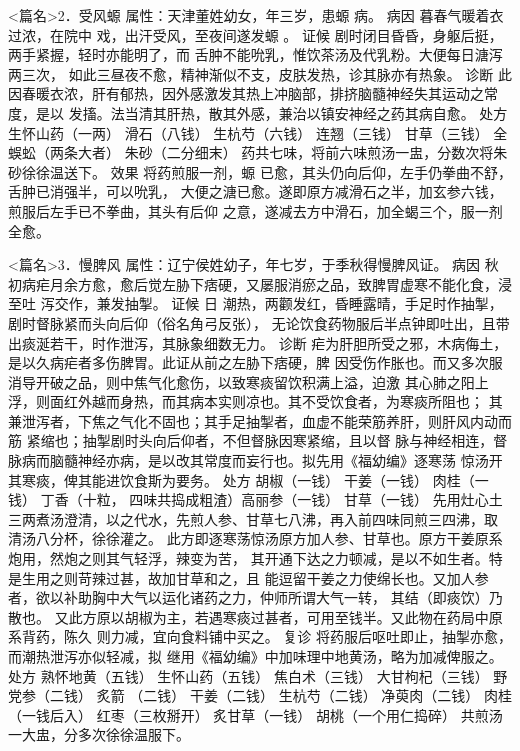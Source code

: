 \documentclass[a4paper,12pt,UTF8,twoside]{ctexbook}
\begin{document}
<篇名>2．受风螈
属性：天津董姓幼女，年三岁，患螈 病。 
病因 暮春气暖着衣过浓，在院中 戏，出汗受风，至夜间遂发螈 。 
证候 剧时闭目昏昏，身躯后挺，两手紧握，轻时亦能明了，而 
舌肿不能吮乳，惟饮茶汤及代乳粉。大便每日溏泻两三次， 
如此三昼夜不愈，精神渐似不支，皮肤发热，诊其脉亦有热象。 
诊断 此因春暖衣浓，肝有郁热，因外感激发其热上冲脑部，排挤脑髓神经失其运动之常度，是以 
发搐。法当清其肝热，散其外感，兼治以镇安神经之药其病自愈。 
处方 生怀山药（一两） 滑石（八钱） 生杭芍（六钱） 连翘（三钱） 
甘草（三钱） 全蜈蚣（两条大者） 朱砂（二分细末） 
药共七味，将前六味煎汤一盅，分数次将朱砂徐徐温送下。 
效果 将药煎服一剂，螈 已愈，其头仍向后仰，左手仍拳曲不舒，舌肿已消强半，可以吮乳， 
大便之溏已愈。遂即原方减滑石之半，加玄参六钱，煎服后左手已不拳曲，其头有后仰 
之意，遂减去方中滑石，加全蝎三个，服一剂全愈。 

<篇名>3．慢脾风
属性：辽宁侯姓幼子，年七岁，于季秋得慢脾风证。 
病因 秋初病疟月余方愈，愈后觉左胁下痞硬，又屡服消瘀之品，致脾胃虚寒不能化食，浸至吐 
泻交作，兼发抽掣。 
证候 日 潮热，两颧发红，昏睡露晴，手足时作抽掣，剧时督脉紧而头向后仰（俗名角弓反张）， 
无论饮食药物服后半点钟即吐出，且带出痰涎若干，时作泄泻，其脉象细数无力。 
诊断 疟为肝胆所受之邪，木病侮土，是以久病疟者多伤脾胃。此证从前之左胁下痞硬，脾 
因受伤作胀也。而又多次服消导开破之品，则中焦气化愈伤，以致寒痰留饮积满上溢，迫激 
其心肺之阳上浮，则面红外越而身热，而其病本实则凉也。其不受饮食者，为寒痰所阻也； 
其兼泄泻者，下焦之气化不固也；其手足抽掣者，血虚不能荣筋养肝，则肝风内动而筋 
紧缩也；抽掣剧时头向后仰者，不但督脉因寒紧缩，且以督 
脉与神经相连，督脉病而脑髓神经亦病，是以改其常度而妄行也。拟先用《福幼编》逐寒荡 
惊汤开其寒痰，俾其能进饮食斯为要务。 
处方 胡椒（一钱） 干姜（一钱） 肉桂（一钱） 丁香（十粒， 
四味共捣成粗渣）高丽参（一钱） 甘草（一钱） 
先用灶心土三两煮汤澄清，以之代水，先煎人参、甘草七八沸，再入前四味同煎三四沸，取 
清汤八分杯，徐徐灌之。 
此方即逐寒荡惊汤原方加人参、甘草也。原方干姜原系炮用，然炮之则其气轻浮，辣变为苦， 
其开通下达之力顿减，是以不如生者。特是生用之则苛辣过甚，故加甘草和之，且 
能逗留干姜之力使绵长也。又加人参者，欲以补助胸中大气以运化诸药之力，仲师所谓大气一转， 
其结（即痰饮）乃散也。 
又此方原以胡椒为主，若遇寒痰过甚者，可用至钱半。又此物在药局中原系背药，陈久 
则力减，宜向食料铺中买之。 
复诊 将药服后呕吐即止，抽掣亦愈，而潮热泄泻亦似轻减，拟 
继用《福幼编》中加味理中地黄汤，略为加减俾服之。 
处方 熟怀地黄（五钱） 生怀山药（五钱） 焦白术（三钱） 大甘枸杞（三钱） 
野党参（二钱） 炙箭 （二钱） 干姜（二钱） 生杭芍（二钱） 
净萸肉（二钱） 肉桂（一钱后入） 红枣（三枚掰开） 炙甘草（一钱） 胡桃（一个用仁捣碎） 
共煎汤一大盅，分多次徐徐温服下。 
\end{document}

